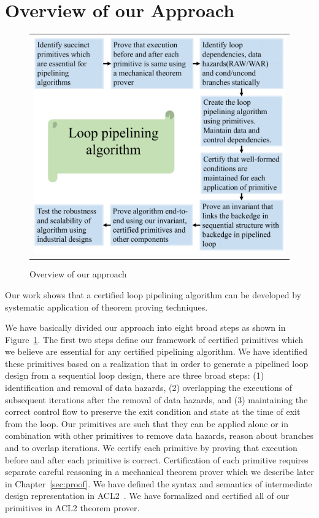 \section {Overview of our Approach}

\begin{figure}[t!]
\begin{center}
\begin{tabular}{c}
\includegraphics[width=4.75in]{fig-proposal/our-approach}
\end{tabular}
\end{center}
\caption{Overview of our approach}
\label{fig:our-approach}
\end{figure}

Our work shows that a certified loop pipelining algorithm can be developed by systematic application of theorem proving techniques. 

We have basically divided our approach into eight broad steps as shown in Figure~\ref{fig:our-approach}. The first two steps define our framework of certified primitives which we believe are essential for any certified pipelining algorithm. We have identified these primitives based on a realization that in order to generate a pipelined loop design from a sequential loop design, there are three broad steps: (1) identification and removal of data hazards, (2) overlapping the executions of subsequent iterations after the removal of data hazards, and (3) maintaining the correct control flow to preserve the exit condition and state at the time of exit from the loop. Our primitives are such that they can be applied alone or in combination with other primitives to remove data hazards, reason about branches and to overlap iterations. We certify each primitive by proving that execution before and after each primitive is correct. Certification of each primitive requires separate careful reasoning in a mechanical theorem prover which we describe later in Chapter~\ref{sec:proof}. We have defined the syntax and semantics of intermediate design representation in ACL2~\cite{car,acl2-sandip}. We have formalized and certified all of our primitives in ACL2 theorem prover.
 
